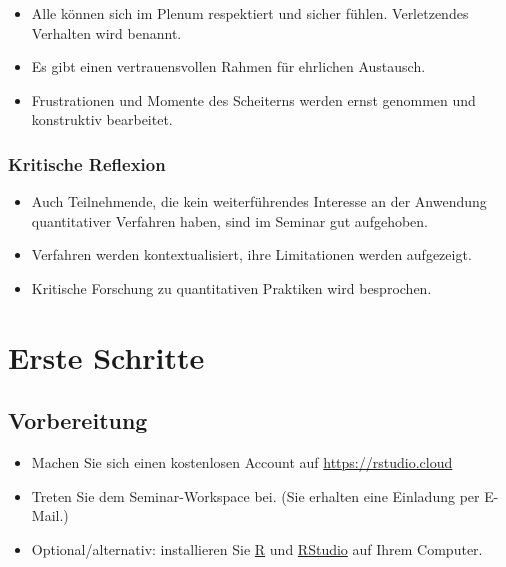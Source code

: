 \documentclass[11pt,german,a4paper]{article}
\providecommand{\tightlist}{%
  \setlength{\itemsep}{0pt}\setlength{\parskip}{0pt}}
\begin{document}
\begin{itemize}
\tightlist
\item
  Alle können sich im Plenum respektiert und sicher fühlen. Verletzendes Verhalten wird benannt.
\item
  Es gibt einen vertrauensvollen Rahmen für ehrlichen Austausch.
\item
  Frustrationen und Momente des Scheiterns werden ernst genommen und konstruktiv bearbeitet.
\end{itemize}

\hypertarget{kritische-reflexion}{%
\subsubsection{Kritische Reflexion}\label{kritische-reflexion}}

\begin{itemize}
\tightlist
\item
  Auch Teilnehmende, die kein weiterführendes Interesse an der Anwendung quantitativer Verfahren haben, sind im Seminar gut aufgehoben.
\item
  Verfahren werden kontextualisiert, ihre Limitationen werden aufgezeigt.
\item
  Kritische Forschung zu quantitativen Praktiken wird besprochen.
\end{itemize}

\hypertarget{erste-schritte}{%
\section{Erste Schritte}\label{erste-schritte}}

\hypertarget{vorbereitung}{%
\subsection*{Vorbereitung}\label{vorbereitung}}

\begin{itemize}
\tightlist
\item
  Machen Sie sich einen kostenlosen Account auf \url{https://rstudio.cloud}
\item
  Treten Sie dem Seminar-Workspace bei. (Sie erhalten eine Einladung per E-Mail.)
\item
  Optional/alternativ: installieren Sie \href{https://www.r-project.org/}{R} und \href{https://rstudio.com/}{RStudio} auf Ihrem Computer.
\end{itemize}
\end{document}
